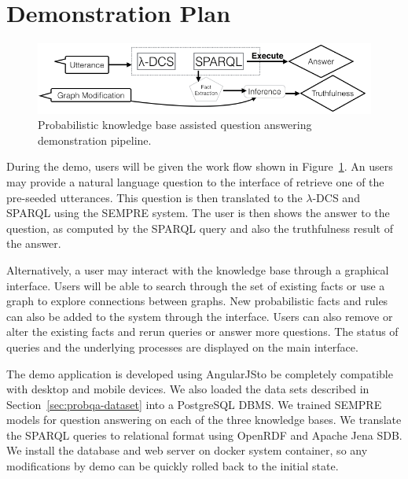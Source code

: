 
\section{Demonstration Plan}

\begin{figure}
\centering
 \includegraphics[width=0.9\linewidth]{images/probqa-pipeline.png}
 \caption{Probabilistic knowledge base assisted question answering demonstration pipeline.}
\label{fig:probqa-pipeline}
\end{figure}


During the demo, users will be given the work flow shown in Figure~\ref{fig:probqa-pipeline}.
An users may provide a natural language question to the interface of retrieve one of the pre-seeded utterances.
This question is then translated to the \(\lambda\)-DCS and SPARQL using the SEMPRE system.
The user is then shows the answer to the question, as computed by the SPARQL
query and also the truthfulness result of the answer.

Alternatively, a user may interact with the knowledge base through a graphical interface.
Users will be able to search through the set of existing facts or use a graph to explore connections between graphs.
New probabilistic facts and rules can also be added to the system through the interface.
Users can also remove or alter the existing facts and rerun queries or answer more questions.
The status of queries and the underlying processes are displayed on the main interface.









The demo application is developed using AngularJS\@ to be completely compatible with desktop and mobile devices.
We also loaded the data sets described in Section~\ref{sec:probqa-dataset} into a PostgreSQL DBMS\@.
We trained SEMPRE models for question answering on each of the three knowledge bases.
We translate the SPARQL queries to relational format using OpenRDF and Apache Jena SDB\@.
We install the database and web server on docker system container, so any modifications by demo can be quickly rolled back to the initial state.





